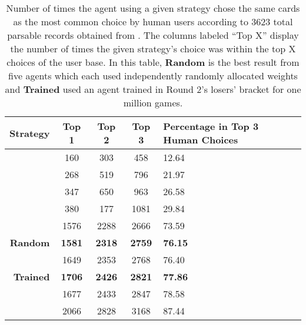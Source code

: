 
\begin{table}
	\centering

	\begin{tabular}{|r|c|c|c|p{4cm}|}
		\hline
		\textbf{Strategy} & \textbf{Top 1} & \textbf{Top 2} & \textbf{Top 3}
			& \textbf{Percentage in Top 3 Human Choices} \\
		\hline
		\peggingminavggiven & 160 & 303 & 458 & 12.64 \\\hline
		\peggingmaxmedgained & 268 & 519 & 796 & 21.97 \\\hline
		\peggingmaxavggained & 347 & 650 & 963 & 26.58 \\\hline
		\cribminavg & 380 & 177 & 1081 & 29.84 \\\hline
		\handmaxmin & 1576 & 2288 & 2666 & 73.59 \\\hline
		\textbf{Random} & \textbf{1581} & \textbf{2318} & \textbf{2759} &
			\textbf{76.15} \\\hline
		\handmaxmed & 1649 & 2353 & 2768 & 76.40 \\\hline
		\textbf{Trained} & \textbf{1706} & \textbf{2426} & \textbf{2821} &
			\textbf{77.86} \\\hline
		\handmaxposs & 1677 & 2433 & 2847 & 78.58 \\\hline
		\handmaxavg & 2066 & 2828 & 3168 & 87.44 \\\hline
	\end{tabular}
	\caption{
		Number of times the agent using a given strategy chose the same cards as
		the most common choice by human users
		according to 3623 total parsable records obtained from
		\cite{dailycribbagehand}.
		The columns labeled ``Top X'' display the number of times the given
		strategy's choice was within the top X choices of the user base.
		In this table,
		\textbf{Random} is the best result from five agents which each used
		independently randomly allocated weights
		and
		\textbf{Trained} used an agent trained in Round 2's losers' bracket
		for one million games.
	}
	\label{tab:expts-starts-human}
\end{table}
